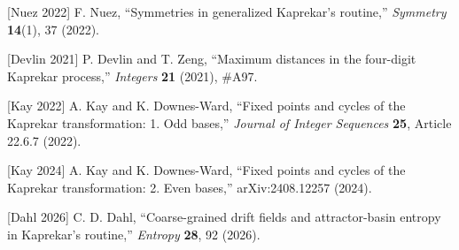 \documentclass[11pt,letterpaper]{article}
\theoremstyle{paperstyle}
\theoremstyle{paperstyledef}
\theoremstyle{paperstylerem}
\begin{document}
{[}Nuez 2022{]} F. Nuez, ``Symmetries in generalized Kaprekar's routine,'' \emph{Symmetry} \textbf{14}(1), 37 (2022).

{[}Devlin 2021{]} P. Devlin and T. Zeng, ``Maximum distances in the four-digit Kaprekar process,'' \emph{Integers} \textbf{21} (2021), \#A97.

{[}Kay 2022{]} A. Kay and K. Downes-Ward, ``Fixed points and cycles of the Kaprekar transformation: 1. Odd bases,'' \emph{Journal of Integer Sequences} \textbf{25}, Article 22.6.7 (2022).

{[}Kay 2024{]} A. Kay and K. Downes-Ward, ``Fixed points and cycles of the Kaprekar transformation: 2. Even bases,'' arXiv:2408.12257 (2024).

{[}Dahl 2026{]} C. D. Dahl, ``Coarse-grained drift fields and attractor-basin entropy in Kaprekar's routine,'' \emph{Entropy} \textbf{28}, 92 (2026).
\end{document}
